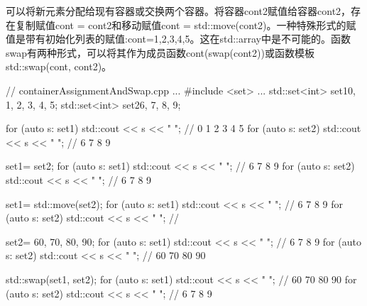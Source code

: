 可以将新元素分配给现有容器或交换两个容器。将容器cont2赋值给容器cont2，存在复制赋值cont = cont2和移动赋值cont = std::move(cont2)。一种特殊形式的赋值是带有初始化列表的赋值:cont={1,2,3,4,5}。这在std::array中是不可能的。函数swap有两种形式，可以将其作为成员函数cont(swap(cont2))或函数模板std::swap(cont, cont2)。


\begin{cpp}
// containerAssignmentAndSwap.cpp
...
#include <set>
...
std::set<int> set1{0, 1, 2, 3, 4, 5};
std::set<int> set2{6, 7, 8, 9};

for (auto s: set1) std::cout << s << " "; // 0 1 2 3 4 5
for (auto s: set2) std::cout << s << " "; // 6 7 8 9

set1= set2;
for (auto s: set1) std::cout << s << " "; // 6 7 8 9
for (auto s: set2) std::cout << s << " "; // 6 7 8 9

set1= std::move(set2);
for (auto s: set1) std::cout << s << " "; // 6 7 8 9
for (auto s: set2) std::cout << s << " "; //

set2= {60, 70, 80, 90};
for (auto s: set1) std::cout << s << " "; // 6 7 8 9
for (auto s: set2) std::cout << s << " "; // 60 70 80 90

std::swap(set1, set2);
for (auto s: set1) std::cout << s << " "; // 60 70 80 90
for (auto s: set2) std::cout << s << " "; // 6 7 8 9
\end{cpp}